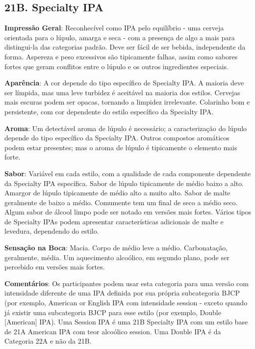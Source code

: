 \subsection*{21B. Specialty IPA}

\textbf{Impressão Geral}: Reconhecível como IPA pelo equilíbrio - uma cerveja orientada para o lúpulo, amarga e seca - com a presença de algo a mais para distingui-la das categorias padrão. Deve ser fácil de ser bebida, independente da forma. Aspereza e peso excessivos são tipicamente falhas, assim como sabores fortes que geram conflitos entre o lúpulo e os outros ingredientes especiais.

\textbf{Aparência}: A cor depende do tipo específico de Specialty IPA. A maioria deve ser límpida, mas uma leve turbidez é aceitável na maioria dos estilos. Cervejas mais escuras podem ser opacas, tornando a limpidez irrelevante. Colarinho bom e persistente, com cor dependente do estilo específico da Specialty IPA.

\textbf{Aroma}: Um detectável aroma de lúpulo é necessário; a caracterização do lúpulo depende do tipo específico da Specialty IPA. Outros compostos aromáticos podem estar presentes; mas o aroma de lúpulo é tipicamente o elemento mais forte.

\textbf{Sabor}: Variável em cada estilo, com a qualidade de cada componente dependente da Specialty IPA específica. Sabor de lúpulo tipicamente de médio baixo a alto. Amargor de lúpulo tipicamente de médio alto a muito alto. Sabor de malte geralmente de baixo a médio. Comumente tem um final de seco a médio seco. Algum sabor de álcool limpo pode ser notado em versões mais fortes. Vários tipos de Specialty IPAs podem apresentar características adicionais de malte e levedura, dependendo do estilo.

\textbf{Sensação na Boca}: Macia. Corpo de médio leve a médio. Carbonatação, geralmente, média. Um aquecimento alcoólico, em segundo plano, pode ser percebido em versões mais fortes.

\textbf{Comentários}: Os participantes podem usar esta categoria para uma versão com intensidade diferente de uma IPA definida por sua própria subcategoria BJCP (por exemplo, American or English IPA com intensidade session - exceto quando já existir uma subcategoria BJCP para esse estilo (por exemplo, Double [American] IPA). Uma Session IPA é uma 21B Specialty IPA com um estilo base de 21A American IPA com teor alcoólico session. Uma Double IPA é da Categoria 22A e não da 21B.

